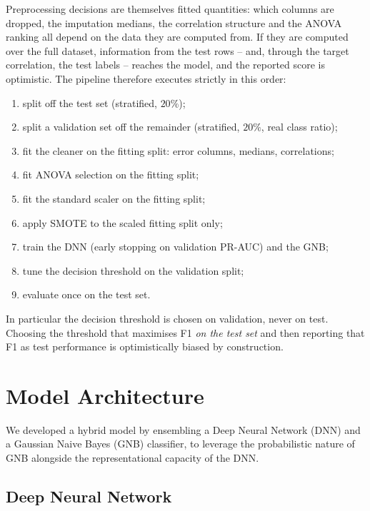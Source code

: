 \documentclass[11pt]{article}
\begin{document}
Preprocessing decisions are themselves fitted quantities: which columns are
dropped, the imputation medians, the correlation structure and the ANOVA
ranking all depend on the data they are computed from. If they are computed
over the full dataset, information from the test rows -- and, through the
target correlation, the test labels -- reaches the model, and the reported
score is optimistic. The pipeline therefore executes strictly in this
order:

\begin{enumerate}[nosep, leftmargin=1.6em]
    \item split off the test set (stratified, $20\%$);
    \item split a validation set off the remainder (stratified, $20\%$, real class ratio);
    \item fit the cleaner on the fitting split: error columns, medians, correlations;
    \item fit ANOVA selection on the fitting split;
    \item fit the standard scaler on the fitting split;
    \item apply SMOTE to the scaled fitting split only;
    \item train the DNN (early stopping on validation PR-AUC) and the GNB;
    \item tune the decision threshold on the validation split;
    \item evaluate once on the test set.
\end{enumerate}

In particular the decision threshold is chosen on validation, never on test.
Choosing the threshold that maximises F1 \emph{on the test set} and then
reporting that F1 as test performance is optimistically biased by construction.

\section{Model Architecture}

We developed a hybrid model by ensembling a Deep Neural Network (DNN) and a
Gaussian Naive Bayes (GNB) classifier, to leverage the probabilistic nature of
GNB alongside the representational capacity of the DNN.

\subsection{Deep Neural Network}
\end{document}
